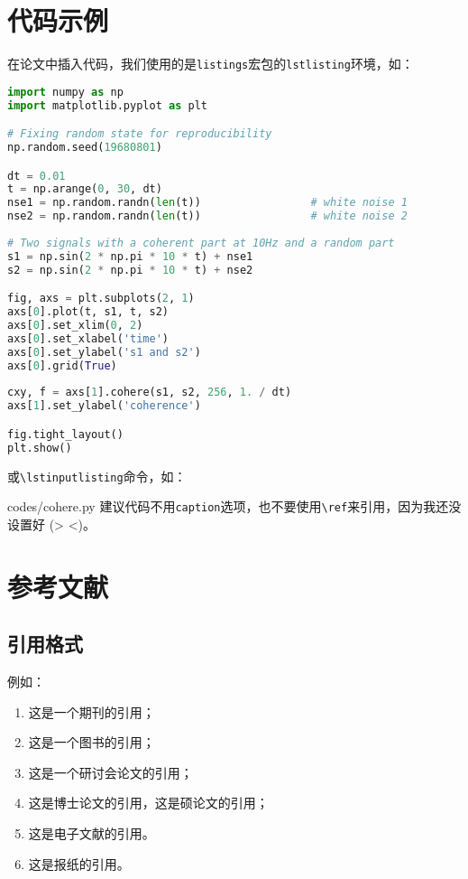 \section{代码示例}

在论文中插入代码，我们使用的是\texttt{listings}宏包的\texttt{lstlisting}环境，如：
\begin{lstlisting}[language=Python,
    caption1=Python 画图代码1,
    caption2=Python ploting code 1]
import numpy as np
import matplotlib.pyplot as plt

# Fixing random state for reproducibility
np.random.seed(19680801)

dt = 0.01
t = np.arange(0, 30, dt)
nse1 = np.random.randn(len(t))                 # white noise 1
nse2 = np.random.randn(len(t))                 # white noise 2
    
# Two signals with a coherent part at 10Hz and a random part
s1 = np.sin(2 * np.pi * 10 * t) + nse1
s2 = np.sin(2 * np.pi * 10 * t) + nse2

fig, axs = plt.subplots(2, 1)
axs[0].plot(t, s1, t, s2)
axs[0].set_xlim(0, 2)
axs[0].set_xlabel('time')
axs[0].set_ylabel('s1 and s2')
axs[0].grid(True)
 
cxy, f = axs[1].cohere(s1, s2, 256, 1. / dt)
axs[1].set_ylabel('coherence')

fig.tight_layout()
plt.show()
\end{lstlisting}
或\texttt{\textbackslash lstinputlisting}命令，如：

{codes/cohere.py}
建议代码不用\texttt{caption}选项，也不要使用\texttt{\textbackslash ref}来引用，因为我还没设置好 (> <)。

\section{参考文献}\label{sec:bibstyle}

\subsection{引用格式}

例如：
\begin{enumerate}
    \item 这是一个期刊的引用\cite{LIGOScientific:2017zic,ZhaoWen:2017twxjz}；
    \item 这是一个图书的引用\cite{Rubakov:2017xzr,Zhang:2021}；
    \item 这是一个研讨会论文的引用\cite{Tanikawa:2021+x}；
    \item 这是博士论文的引用\cite{Migenda:2019xbm,HuangGuoYuan:2020}，这是硕论文的引用\cite{Shojaeifar:2015csv,SongRen:2020}；
    \item 这是电子文献的引用\cite{Piro:2021oaa,bilibili:read}。
    \item 这是报纸的引用\cite{Li:2005}。
\end{enumerate}

